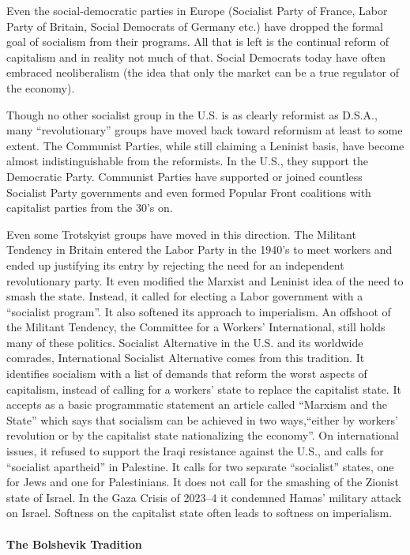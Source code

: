 Even the social-democratic parties in Europe (Socialist Party of France, Labor Party of Britain, Social Democrats of Germany etc.) have dropped the formal goal of socialism from their programs. All that is left is the continual reform of capitalism and in reality not much of that. Social Democrats today have often embraced neoliberalism (the idea that only the market can be a true regulator of the economy).

Though no other socialist group in the U.S. is as clearly reformist as D.S.A., many ``revolutionary'' groups have moved back toward reformism at least to some extent. The Communist Parties, while still claiming a Leninist basis, have become almost indistinguishable from the reformists. In the U.S., they support the Democratic Party. Communist Parties have supported or joined countless Socialist Party governments and even formed Popular Front coalitions with capitalist parties from the 30's on.

Even some Trotskyist groups have moved in this direction. The Militant Tendency in Britain entered the Labor Party in the 1940's to meet workers and ended up justifying its entry by rejecting the need for an independent revolutionary party. It even modified the Marxist and Leninist idea of the need to smash the state. Instead, it called for electing a Labor government with a ``socialist program''. It also softened its approach to imperialism. An offshoot of the Militant Tendency, the Committee for a Workers' International, still holds many of these politics. Socialist Alternative in the U.S. and its worldwide comrades, International Socialist Alternative comes from this tradition. It identifies socialism with a list of demands that reform the worst aspects of capitalism, instead of calling for a workers' state to replace the capitalist state. It accepts as a basic programmatic statement an article called ``Marxism and the State'' which says that socialism can be achieved in two ways,``either by workers' revolution or by the capitalist state nationalizing the economy''. On international issues, it refused to support the Iraqi resistance against the U.S., and calls for ``socialist apartheid'' in Palestine. It calls for two separate ``socialist'' states, one for Jews and one for Palestinians. It does not call for the smashing of the Zionist state of Israel. In the Gaza Crisis of 2023--4 it condemned Hamas' military attack on Israel. Softness on the capitalist state often leads to softness on imperialism.

\paragraph{The Bolshevik Tradition}

